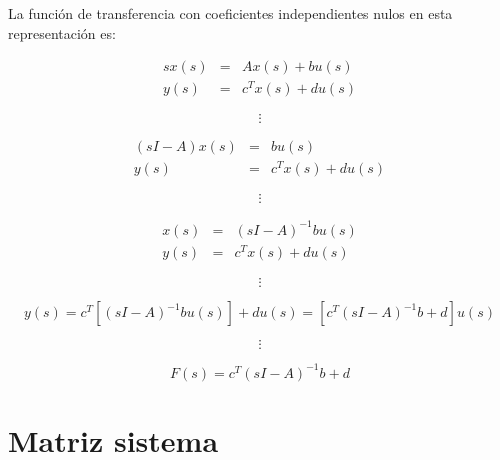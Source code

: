         La función de transferencia con coeficientes independientes nulos en esta representación es:

        \begin{eqnarray}
        s x(s) & = & A x(s) + b u(s) \nonumber \\
        y(s) & = & c^T x(s) + d u(s) \nonumber
        \end{eqnarray}

        \begin{equation}
            \vdots \nonumber
        \end{equation}

        \begin{eqnarray}
        (s I - A) x(s) & = & b u(s) \nonumber \\
        y(s) & = & c^T x(s) + d u(s) \nonumber
        \end{eqnarray}

        \begin{equation}
            \vdots \nonumber
        \end{equation}

        \begin{eqnarray}
        x(s) & = & (s I - A)^{-1} b u(s) \nonumber \\
        y(s) & = & c^T x(s) + d u(s) \nonumber
        \end{eqnarray}

        \begin{equation}
            \vdots \nonumber
        \end{equation}

        \begin{equation}
            y(s) = c^T[(s I - A)^{-1} b u(s)] + d u(s) = [c^T(s I - A)^{-1} b + d] u(s) \nonumber
        \end{equation}

        \begin{equation}
            \vdots \nonumber
        \end{equation}

        \begin{equation}
            F(s) = c^T(s I - A)^{-1} b + d
        \end{equation}


    \newpage
    \section{Matriz sistema}

